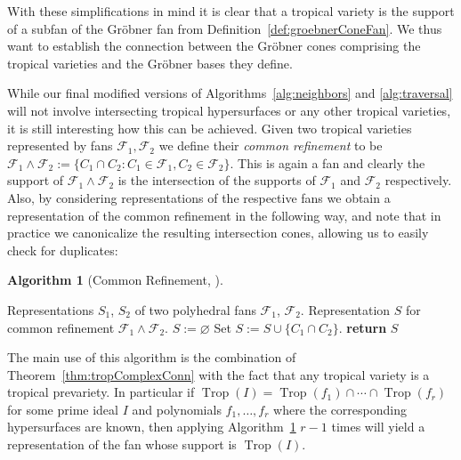 \documentclass[
  paper=a4,
  titlepage,
  bibliography=totoc,
  listof=totoc,
  pagesize=pdftex
]{scrartcl}
\numberwithin{figure}{section}
\numberwithin{equation}{section}
\numberwithin{table}{section}
\DeclareMathOperator{\Trop}{Trop}
\theoremstyle{definition}
\newtheorem{algo}[definition]{Algorithm}
\numberwithin{definition}{section}
\begin{document}
With these simplifications in mind it is clear that a tropical variety is the support of a
subfan of the Gröbner fan from Definition~\ref{def:groebnerConeFan}. We thus want to
establish the connection between the Gröbner cones comprising the tropical varieties and
the Gröbner bases they define.


While our final modified versions of Algorithms~\ref{alg:neighbors} and \ref{alg:traversal}
will not involve intersecting tropical hypersurfaces or any other tropical varieties, it
is still interesting how this can be achieved. Given two tropical varieties
represented by fans $\mathcal F_1, \mathcal F_2$ we define their \emph{common refinement}
to be $\mathcal F_1 \wedge \mathcal F_2 := \{ C_1 \cap C_2 : C_1 \in \mathcal F_1, C_2 \in
\mathcal F_2 \}$. This is again a fan and clearly the support of $\mathcal F_1 \wedge
\mathcal F_2$ is the intersection of the supports of $\mathcal F_1$ and $\mathcal F_2$
respectively. Also, by considering representations of the respective fans we obtain a
representation of the common refinement in the following way, and note that in practice we
canonicalize the resulting intersection cones, allowing us to easily check for duplicates:

\begin{algo}[Common Refinement, {\cite[Algorithm~4.4]{compTropVar}}]\
  \label{alg:fanRefinement}
  \begin{algorithmic}[1]
    \Require Representations $S_1$, $S_2$ of two polyhedral fans $\mathcal
      F_1$, $\mathcal F_2$.
    \Ensure Representation $S$ for common refinement $\mathcal F_1 \wedge \mathcal F_2$.
    \State $S := \varnothing$
      \State Set $S := S \cup \{ C_1 \cap C_2 \}$.
    \EndFor
    \State\textbf{return} $S$
  \end{algorithmic}
\end{algo}

The main use of this algorithm is the combination of Theorem~\ref{thm:tropComplexConn}
with the fact that any tropical variety is a tropical prevariety. In particular if
$\Trop(I) = \Trop(f_1) \cap \cdots \cap \Trop(f_r)$ for some prime ideal $I$ and
polynomials $f_1, \dots, f_r$ where the corresponding hypersurfaces are known, then
applying Algorithm~\ref{alg:fanRefinement} $r-1$ times will yield a representation of the
fan whose support is $\Trop(I)$.

\end{document}
